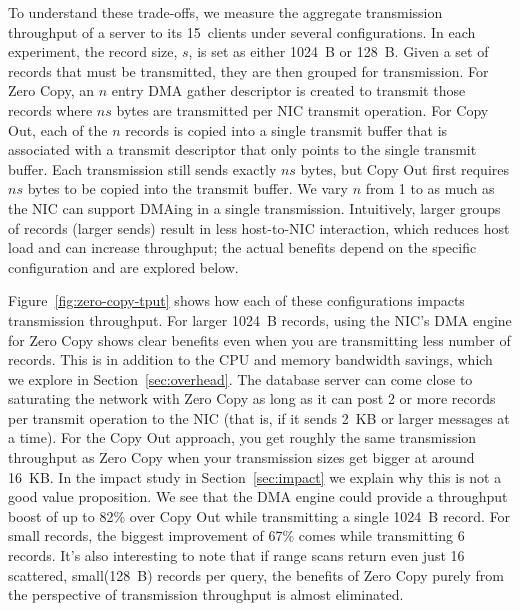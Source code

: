 To understand these trade-offs, we measure the aggregate transmission
throughput of a server to its 15~clients under several
configurations.  In each experiment, the record size, $s$, is set as either 1024~B or
128~B. Given a set of records that must be transmitted, they are then grouped
for transmission. For Zero Copy, an $n$ entry DMA gather descriptor is created
to transmit those records where $ns$ bytes are transmitted per NIC transmit
operation. For Copy Out, each of the $n$ records is copied into a single
transmit buffer that is associated with a transmit descriptor that only points
to the single transmit buffer. Each transmission still sends exactly $ns$
bytes, but Copy Out first requires $ns$ bytes to be copied into the transmit buffer.
We vary $n$ from 1 to as much as the NIC can support DMAing in a single transmission.
Intuitively, larger groups of records (larger sends) result in less host-to-NIC
interaction, which reduces host load and can increase throughput; the actual benefits
depend on the specific configuration and are explored below.

Figure~\ref{fig:zero-copy-tput} shows how each of these configurations impacts
transmission throughput. For larger 1024~B records, using the NIC's DMA engine
for Zero Copy shows clear benefits even when you are transmitting less number of 
records. This is in addition to the CPU and memory bandwidth savings, which 
we explore in Section~\ref{sec:overhead}. The database server can come close to
saturating the network with Zero Copy as long as it can post 2 or more
records per transmit operation to the NIC (that is, if it sends 2~KB or larger
messages at a time). For the Copy Out approach, you get roughly the same transmission 
throughput as Zero Copy when your transmission sizes get bigger at around 16~KB. In 
the impact study in Section~\ref{sec:impact} we explain why this is not a good value 
proposition. We see that the DMA engine could provide a throughput boost
of up to 82\% over Copy Out while transmitting a single 1024~B record. For small 
records, the biggest improvement of 67\% comes while transmitting 6 records. It's also interesting 
to note that if range scans return even just 16 scattered, small(128~B) records per query, the
benefits of Zero Copy purely from the perspective of transmission throughput is almost eliminated.


